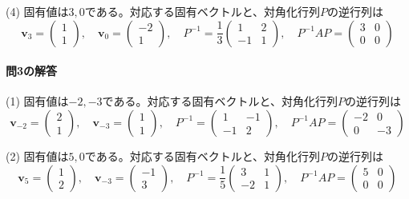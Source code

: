 (4) 固有値は$3, 0$である。対応する固有ベクトルと、対角化行列$P$の逆行列は
\[
\bm{v}_3 = 
\begin{pmatrix}
1 \\
1
\end{pmatrix}, \quad
\bm{v}_0 = 
\begin{pmatrix}
-2 \\
1
\end{pmatrix}, \quad
P^{-1} = 
\frac{1}{3}
\begin{pmatrix}
1 & 2 \\
-1 & 1
\end{pmatrix}, \quad
P^{-1} AP =
\begin{pmatrix}
3 & 0 \\
0 & 0
\end{pmatrix}
\]

\paragraph{問3の解答}

(1) 固有値は$-2, -3$である。対応する固有ベクトルと、対角化行列$P$の逆行列は
\[
\bm{v}_{-2} = 
\begin{pmatrix}
2 \\
1
\end{pmatrix}, \quad
\bm{v}_{-3} = 
\begin{pmatrix}
1 \\
1
\end{pmatrix}, \quad
P^{-1} = 
\begin{pmatrix}
1 & -1 \\
-1 & 2
\end{pmatrix}, \quad
P^{-1} AP =
\begin{pmatrix}
-2 & 0 \\
0 & -3
\end{pmatrix}
\]

(2) 固有値は$5, 0$である。対応する固有ベクトルと、対角化行列$P$の逆行列は
\[
\bm{v}_5 = 
\begin{pmatrix}
1 \\
2
\end{pmatrix}, \quad
\bm{v}_{-3} = 
\begin{pmatrix}
-1 \\
3
\end{pmatrix}, \quad
P^{-1} = 
\frac{1}{5}
\begin{pmatrix}
3 & 1 \\
-2 & 1
\end{pmatrix}, \quad
P^{-1} AP =
\begin{pmatrix}
5 & 0 \\
0 & 0
\end{pmatrix}
\]

